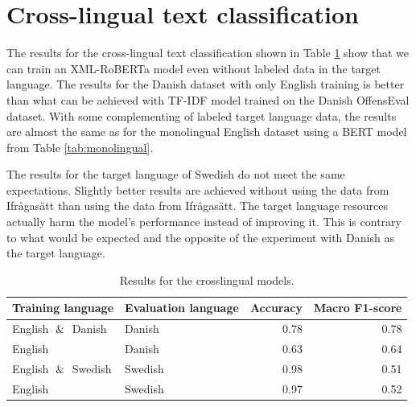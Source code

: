 \documentclass[nofilelist]{cslthse-msc}
\begin{document}
\section{Cross-lingual text classification}

The results for the cross-lingual text classification shown in Table \ref{tab:crosslingual} show that we can train an XML-RoBERTa model even without labeled data in the target language. The results for the Danish dataset with only English training is better than what can be achieved with TF-IDF model trained on the Danish OffensEval dataset. With some complementing of labeled target language data, the results are almost the same as for the monolingual English dataset using a BERT model from Table \ref{tab:monolingual}.

The results for the target language of Swedish do not meet the same expectations. Slightly better results are achieved without using the data from Ifrågasätt than using the data from Ifrågasätt. The target language resources actually harm the model's performance instead of improving it. This is contrary to what would be expected and the opposite of the experiment with Danish as the target language. 

\begin{table}[t]
\centering
\begin{tabular}{@{}llrr@{}}
\toprule
Training language & Evaluation language & Accuracy & Macro F1-score  \\ \midrule
English $\And$ Danish & Danish & 0.78 & 0.78 \\
English & Danish & 0.63 & 0.64 \\
English $\And$ Swedish & Swedish & 0.98 & 0.51 \\
English & Swedish & 0.97 & 0.52 \\
\bottomrule
\end{tabular}
\caption{Results for the crosslingual models.}
\label{tab:crosslingual}
\end{table}
\end{document}
